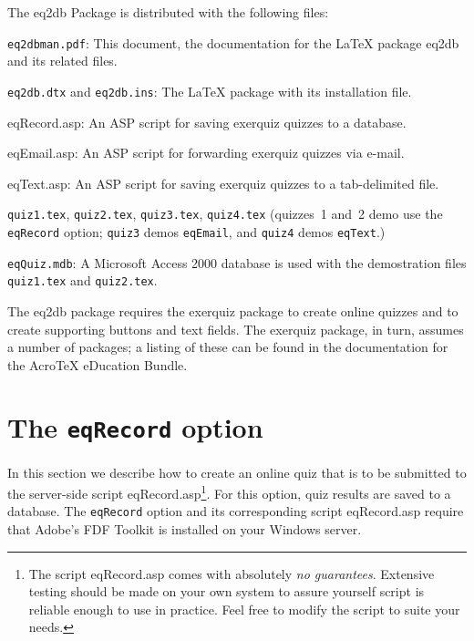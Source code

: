 \documentclass{article}
\def\AcroT{Acro\!\TeX}\def\cAcroT{{\textcolor{blue}{\AcroT}}}
\def\AcroEB{\AcroT{} eDucation Bundle}\def\cAcroEB{\textcolor{blue}{\AcroEB}}
\let\pkg\textsf
\let\opt\texttt
\let\app\textsf
\def\parboxValign{t}
\newcommand{\FmtMP}[2][0pt]{\mbox{}\marginpar{%
    \raisebox{.5\baselineskip+#1}{%
    \expandafter\parbox\expandafter[\parboxValign]%
        {\marginparwidth}{\aebbkFmtMp#2}}}}
\def\aebbkFmtMp{\kern0pt\itshape\small
    \ifusebw\color{gray}\else\color{blue}\fi
    \raggedleft\hspace{0pt}}
\begin{document}
The \pkg{eq2db} Package is distributed with the following files:
\begin{questions}
    \item \texttt{eq2dbman.pdf}: This document, the documentation for
        the {\LaTeX} package \pkg{eq2db} and its related files.
    \item \texttt{eq2db.dtx} and \texttt{eq2db.ins}: The {\LaTeX} package
        with its installation file.
    \item \textsf{eqRecord.asp}: An \textsf{ASP} script for saving \pkg{exerquiz}
        quizzes to a data\-base.
    \item \textsf{eqEmail.asp}: An \textsf{ASP} script for forwarding \pkg{exerquiz}
        quizzes via e-mail.
    \item \textsf{eqText.asp}: An \textsf{ASP} script for saving \pkg{exerquiz}
        quizzes to a tab-delimited file.
    \item \texttt{quiz1.tex}, \texttt{quiz2.tex}, \texttt{quiz3.tex},
        \texttt{quiz4.tex} (quizzes~1 and~2 demo use the \texttt{eqRecord}
        option; \texttt{quiz3} demos \texttt{eqEmail}, and \texttt{quiz4}
        demos \texttt{eqText}.)
    \item \texttt{eqQuiz.mdb}: A Microsoft Access 2000 database is used
        with the demostration files \texttt{quiz1.tex} and \texttt{quiz2.tex}.
\end{questions}

The \pkg{eq2db} package requires the \pkg{exerquiz} package to create online
quizzes and to create supporting buttons and text fields. The \pkg{exerquiz}
package, in turn, assumes a number of packages; a listing of these can be
found in the documentation for the \AcroEB.

\section{The \texttt{eqRecord} option}\label{eqRecordOption}

In this section we describe how to create an online quiz that is to be
submitted to the server-side script \app{eqRecord.asp}\footnote{The script
\textsf{eqRecord.asp} comes with absolutely \emph{no guarantees}. Extensive
testing should be made on your own system to assure yourself script is
reliable enough to use in practice.  Feel free to modify the script to suite
your needs.}. For this option, quiz results are saved to a database. The
\opt{eqRecord} option and its corresponding script \app{eqRecord.asp} require
that Adobe's \textsf{FDF Toolkit} is installed on
your \app{Windows} server\FmtMP[\baselineskip]{FDF Toolkit required}.
\end{document}
